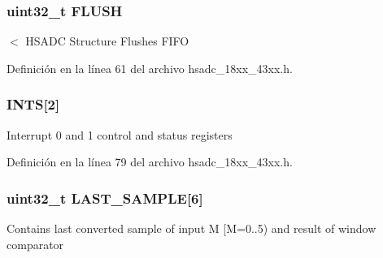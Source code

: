 \subsubsection[{\texorpdfstring{F\+L\+U\+SH}{FLUSH}}]{ uint32\+\_\+t F\+L\+U\+SH}\hypertarget{struct_l_p_c___h_s_a_d_c___t_a65711c46739bd87210a31ee2f03fe98d}{}\label{struct_l_p_c___h_s_a_d_c___t_a65711c46739bd87210a31ee2f03fe98d}
$<$ H\+S\+A\+DC Structure Flushes F\+I\+FO 

Definición en la línea 61 del archivo hsadc\+\_\+18xx\+\_\+43xx.\+h.

\subsubsection[{\texorpdfstring{I\+N\+TS}{INTS}}]{ I\+N\+TS\mbox{[}2\mbox{]}}\hypertarget{struct_l_p_c___h_s_a_d_c___t_af7673c407512853f680e3fc58dca032a}{}\label{struct_l_p_c___h_s_a_d_c___t_af7673c407512853f680e3fc58dca032a}
Interrupt 0 and 1 control and status registers 

Definición en la línea 79 del archivo hsadc\+\_\+18xx\+\_\+43xx.\+h.

\subsubsection[{\texorpdfstring{L\+A\+S\+T\+\_\+\+S\+A\+M\+P\+LE}{LAST_SAMPLE}}]{ uint32\+\_\+t L\+A\+S\+T\+\_\+\+S\+A\+M\+P\+LE\mbox{[}6\mbox{]}}\hypertarget{struct_l_p_c___h_s_a_d_c___t_a044765cf52d32a129a87488f24431d38}{}\label{struct_l_p_c___h_s_a_d_c___t_a044765cf52d32a129a87488f24431d38}
Contains last converted sample of input M \mbox{[}M=0..5) and result of window comparator 

